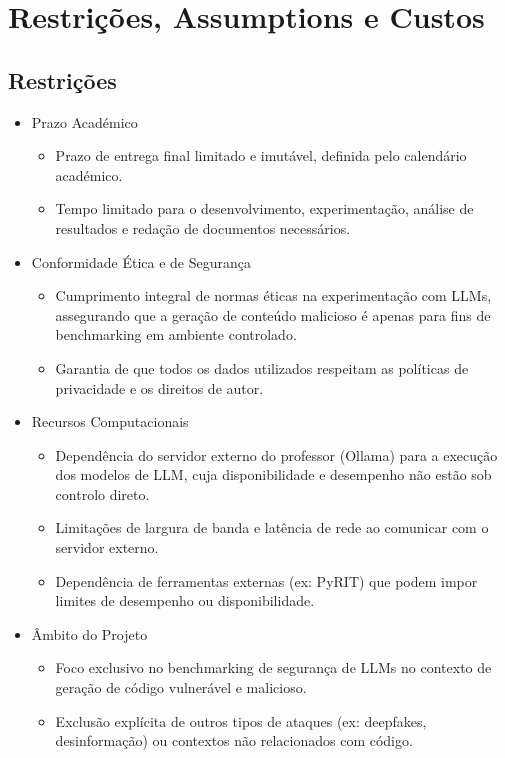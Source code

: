 \section{Restrições, Assumptions e Custos}

\subsection{Restrições}

\begin{itemize}
  \item Prazo Académico
  \begin{itemize}
    \item Prazo de entrega final limitado e imutável, definida pelo calendário académico.
    \item Tempo limitado para o desenvolvimento, experimentação, análise de resultados e redação de documentos necessários.
  \end{itemize}

  \item Conformidade Ética e de Segurança
  \begin{itemize}
    \item Cumprimento integral de normas éticas na experimentação com LLMs, assegurando que a geração de conteúdo malicioso é apenas para fins de benchmarking em ambiente controlado.
    \item Garantia de que todos os dados utilizados respeitam as políticas de privacidade e os direitos de autor.
  \end{itemize}

  \item Recursos Computacionais
  \begin{itemize}
    \item Dependência do servidor externo do professor (Ollama) para a execução dos modelos de LLM, cuja disponibilidade e desempenho não estão sob controlo direto.
    \item Limitações de largura de banda e latência de rede ao comunicar com o servidor externo.
    \item Dependência de ferramentas externas (ex: PyRIT) que podem impor limites de desempenho ou disponibilidade.
  \end{itemize}

  \item Âmbito do Projeto
  \begin{itemize}
    \item Foco exclusivo no benchmarking de segurança de LLMs no contexto de geração de código vulnerável e malicioso.
    \item Exclusão explícita de outros tipos de ataques (ex: deepfakes, desinformação) ou contextos não relacionados com código.
  \end{itemize}


\end{itemize}
